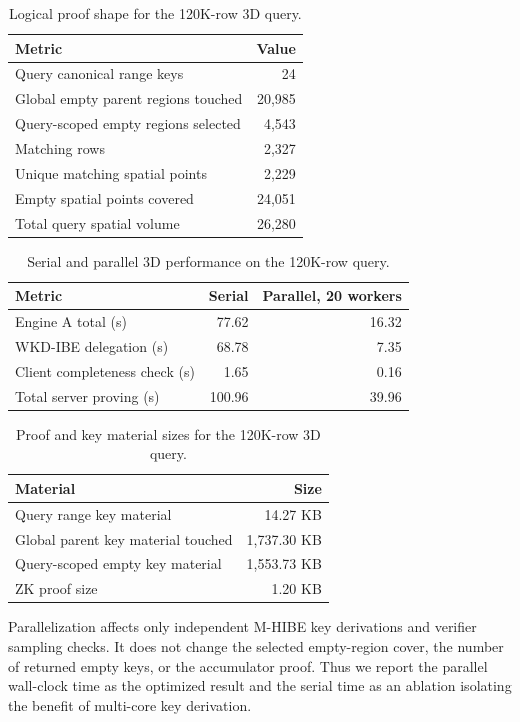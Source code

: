 \documentclass[11pt]{article}
\begin{document}
\begin{table}[t]
\centering
\caption{Logical proof shape for the 120K-row 3D query.}
\label{tab:proof-shape}
\begin{tabular}{lr}
\toprule
Metric & Value \\
\midrule
Query canonical range keys & 24 \\
Global empty parent regions touched & 20,985 \\
Query-scoped empty regions selected & 4,543 \\
Matching rows & 2,327 \\
Unique matching spatial points & 2,229 \\
Empty spatial points covered & 24,051 \\
Total query spatial volume & 26,280 \\
\bottomrule
\end{tabular}
\end{table}

\begin{table}[t]
\centering
\caption{Serial and parallel 3D performance on the 120K-row query.}
\label{tab:parallel}
\begin{tabular}{lrr}
\toprule
Metric & Serial & Parallel, 20 workers \\
\midrule
Engine A total (s) & 77.62 & 16.32 \\
WKD-IBE delegation (s) & 68.78 & 7.35 \\
Client completeness check (s) & 1.65 & 0.16 \\
Total server proving (s) & 100.96 & 39.96 \\
\bottomrule
\end{tabular}
\end{table}

\begin{table}[t]
\centering
\caption{Proof and key material sizes for the 120K-row 3D query.}
\label{tab:sizes}
\begin{tabular}{lr}
\toprule
Material & Size \\
\midrule
Query range key material & 14.27 KB \\
Global parent key material touched & 1,737.30 KB \\
Query-scoped empty key material & 1,553.73 KB \\
ZK proof size & 1.20 KB \\
\bottomrule
\end{tabular}
\end{table}

Parallelization affects only independent M-HIBE key derivations and verifier sampling checks. It does not change the selected empty-region cover, the number of returned empty keys, or the accumulator proof. Thus we report the parallel wall-clock time as the optimized result and the serial time as an ablation isolating the benefit of multi-core key derivation.
\end{document}
